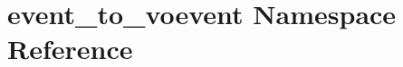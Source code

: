 \hypertarget{namespaceevent__to__voevent}{\section{event\-\_\-to\-\_\-voevent Namespace Reference}
\label{namespaceevent__to__voevent}
}
